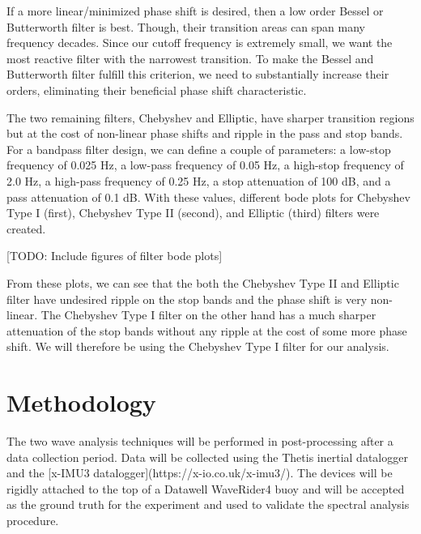 If a more linear/minimized phase shift is desired, then a low order Bessel or Butterworth filter is best. 
Though, their transition areas can span many frequency decades. 
Since our cutoff frequency is extremely small, we want the most reactive filter with the narrowest transition. 
To make the Bessel and Butterworth filter fulfill this criterion, we need to substantially increase their orders, eliminating their beneficial phase shift characteristic.

The two remaining filters, Chebyshev and Elliptic, have sharper transition regions but at the cost of non-linear phase shifts and ripple in the pass and stop bands. 
For a bandpass filter design, we can define a couple of parameters: a low-stop frequency of 0.025 Hz, a low-pass frequency of 0.05 Hz, a high-stop frequency of 2.0 Hz, a high-pass frequency of 0.25 Hz, a stop attenuation of 100 dB, and a pass attenuation of 0.1 dB. 
With these values, different bode plots for Chebyshev Type I (first), Chebyshev Type II (second), and Elliptic (third) filters were created.




[TODO: Include figures of filter bode plots]

From these plots, we can see that the both the Chebyshev Type II and Elliptic filter have undesired ripple on the stop bands and the phase shift is very non-linear. 
The Chebyshev Type I filter on the other hand has a much sharper attenuation of the stop bands without any ripple at the cost of some more phase shift. 
We will therefore be using the Chebyshev Type I filter for our analysis.

\section{Methodology}
The two wave analysis techniques will be performed in post-processing after a data collection period. 
Data will be collected using the Thetis inertial datalogger and the [x-IMU3 datalogger](https://x-io.co.uk/x-imu3/). 
The devices will be rigidly attached to the top of a Datawell WaveRider4 buoy and will be accepted as the ground truth for the experiment and used to validate the spectral analysis procedure.

